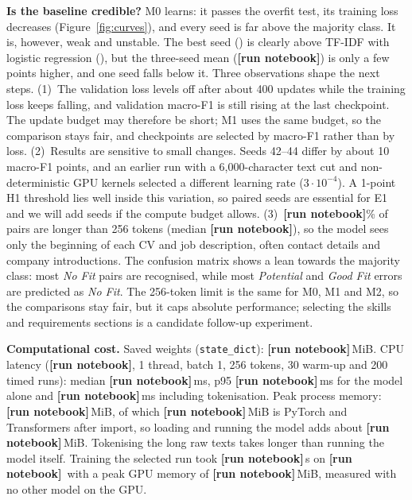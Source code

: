 \documentclass[11pt]{article}
\newcommand{\RUN}{\textbf{[run notebook]}}
\newcommand{\TokPairMedian}{\RUN}\newcommand{\TokPairNinety}{\RUN}\newcommand{\TruncPct}{\RUN}
\newcommand{\MzeroFoneMean}{\RUN}\newcommand{\MzeroFoneSD}{\RUN}\newcommand{\MzeroAccMean}{\RUN}\newcommand{\MzeroAccSD}{\RUN}
\newcommand{\MzeroSizeMB}{\RUN}\newcommand{\MzeroLatMed}{\RUN}\newcommand{\MzeroLatPninetyfive}{\RUN}
\newcommand{\MzeroLatTokMed}{\RUN}\newcommand{\MzeroRSS}{\RUN}\newcommand{\MzeroRSSBase}{\RUN}\newcommand{\MzeroRSSDelta}{\RUN}
\newcommand{\MzeroTrainTime}{\RUN}\newcommand{\MzeroPeakGPU}{\RUN}
\newcommand{\EnvGPU}{\RUN}\newcommand{\EnvCPU}{\RUN}\newcommand{\EnvTorch}{\RUN}\newcommand{\EnvTransformers}{\RUN}
\begin{document}
\textbf{Is the baseline credible?} M0 learns: it passes the overfit test, its training loss decreases (Figure~\ref{fig:curves}), and every seed is far above the majority class. It is, however, weak and unstable. The best seed (\MzeroFone) is clearly above TF-IDF with logistic regression (\TfidfFone), but the three-seed mean (\MzeroFoneMean) is only a few points higher, and one seed falls below it. Three observations shape the next steps.
(1)~The validation loss levels off after about 400 updates while the training loss keeps falling, and validation macro-F1 is still rising at the last checkpoint. The update budget may therefore be short; M1 uses the same budget, so the comparison stays fair, and checkpoints are selected by macro-F1 rather than by loss.
(2)~Results are sensitive to small changes. Seeds 42--44 differ by about 10 macro-F1 points, and an earlier run with a 6,000-character text cut and non-deterministic GPU kernels selected a different learning rate ($3\cdot10^{-4}$). A 1-point H1 threshold lies well inside this variation, so paired seeds are essential for E1 and we will add seeds if the compute budget allows.
(3)~\TruncPct\% of pairs are longer than 256 tokens (median \TokPairMedian), so the model sees only the beginning of each CV and job description, often contact details and company introductions. The confusion matrix shows a lean towards the majority class: most \emph{No Fit} pairs are recognised, while most \emph{Potential} and \emph{Good Fit} errors are predicted as \emph{No Fit}. The 256-token limit is the same for M0, M1 and M2, so the comparisons stay fair, but it caps absolute performance; selecting the skills and requirements sections is a candidate follow-up experiment.

\textbf{Computational cost.} Saved weights (\texttt{state\_dict}): \MzeroSizeMB\,MiB. CPU latency (\EnvCPU, 1 thread, batch 1, 256 tokens, 30 warm-up and 200 timed runs): median \MzeroLatMed\,ms, p95 \MzeroLatPninetyfive\,ms for the model alone and \MzeroLatTokMed\,ms including tokenisation. Peak process memory: \MzeroRSS\,MiB, of which \MzeroRSSBase\,MiB is PyTorch and Transformers after import, so loading and running the model adds about \MzeroRSSDelta\,MiB. Tokenising the long raw texts takes longer than running the model itself. Training the selected run took \MzeroTrainTime\,s on \EnvGPU\ with a peak GPU memory of \MzeroPeakGPU\,MiB, measured with no other model on the GPU.
\end{document}
